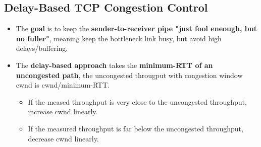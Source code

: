\documentclass[16pt]{article}
\begin{document}
    \subsection*{Delay-Based TCP Congestion Control}
    \begin{itemize}
        \item The \textbf{goal} is to keep the \textbf{sender-to-receiver pipe "just fool eneough, but no fuller"}, meaning keep the bottleneck link busy, but avoid high delays/buffering.
        \item The \textbf{delay-based approach} takes the \textbf{minimum-RTT of an uncongested path}, the uncongested througput with congestion window cwnd is cwnd/minimum-RTT.
        \begin{itemize}
            \item If the meased throughput is very close to the uncongested throughput, increase cwnd linearly.
            \item If the measured throughput is far below the uncongested throughput, decrease cwnd linearly.
        \end{itemize}
    \end{itemize}
\end{document}
